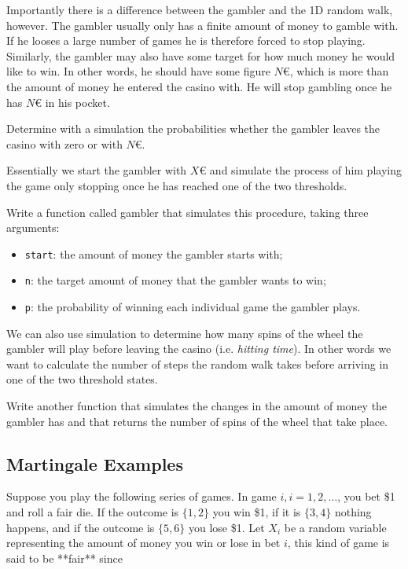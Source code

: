 \documentclass[12pt,a4paper]{article}
\begin{document}
Importantly there is a difference between the gambler and the 1D random walk, however. The gambler usually only has a finite amount of money to gamble with. If he looses a large number of games he is therefore forced to stop playing. Similarly, the gambler may also have some target for how much money he would like to win. In other words, he should have some figure $N$€, which is more than the amount of money he entered the casino with. He will stop gambling once he has $N$€ in his pocket.

\begin{question}
Determine with a simulation the probabilities whether the gambler leaves the casino with zero or with $N$€.

Essentially we start the gambler with $X$€ and simulate the process of him playing the game only stopping once he has reached one of the two thresholds.

Write a function called gambler that simulates this procedure, taking three arguments:
\begin{itemize}
\item \texttt{start}: the amount of money the gambler starts with; \item \texttt{n}: the target amount of money that the gambler wants to win;
\item \texttt{p}: the probability of winning each individual game the gambler plays.
\end{itemize}
\end{question}

We can also use simulation to determine how many spins of the wheel the gambler will play before leaving the casino (i.e. \emph{hitting time}).
In other words we want to calculate the number of steps the random walk takes before arriving in one of the two threshold states.

\begin{question}
Write another function that simulates the changes in the amount of money the gambler has and that returns the number of spins of the wheel that take place.
\end{question}

\subsection{Martingale Examples}
Suppose you play the following series of games. In game $i, i = 1, 2,\ldots$, you bet \$1 and roll a fair die. If the outcome is $\{1,2\}$ you win \$1, if it is $\{3,4\}$ nothing happens, and if the outcome is $\{5,6\}$ you lose \$1.
Let $X_i$ be a random variable representing the amount of money you win or lose in bet $i$, this kind of game is said to be **fair** since
\end{document}
